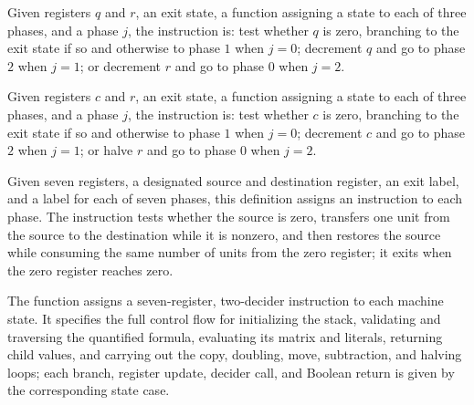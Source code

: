 \begin{definition}
\label{Complexity.LogProg.TQBFARM.sbI}
\leanok
{}
Given registers $q$ and $r$, an exit state, a function assigning a state to each of
three phases, and a phase $j$, the instruction is: test whether $q$ is zero, branching
to the exit state if so and otherwise to phase $1$ when $j=0$; decrement $q$ and go to
phase $2$ when $j=1$; or decrement $r$ and go to phase $0$ when $j=2$.
\end{definition}

\begin{definition}
\label{Complexity.LogProg.TQBFARM.hvI}
\leanok
{}
Given registers $c$ and $r$, an exit state, a function assigning a state to each of
three phases, and a phase $j$, the instruction is: test whether $c$ is zero, branching
to the exit state if so and otherwise to phase $1$ when $j=0$; decrement $c$ and go to
phase $2$ when $j=1$; or halve $r$ and go to phase $0$ when $j=2$.
\end{definition}

\begin{definition}
\label{Complexity.LogProg.TQBFARM.cpI}
\leanok
{}
Given seven registers, a designated source and destination register, an exit label, and
a label for each of seven phases, this definition assigns an instruction to each phase.
The instruction tests whether the source is zero, transfers one unit from the source to
the destination while it is nonzero, and then restores the source while consuming the
same number of units from the zero register; it exits when the zero register reaches
zero.
\end{definition}

\begin{definition}
\label{Complexity.LogProg.TQBFARM.A}
\leanok
{}
The function assigns a seven-register, two-decider instruction to each machine state. It
specifies the full control flow for initializing the stack, validating and traversing
the quantified formula, evaluating its matrix and literals, returning child values, and
carrying out the copy, doubling, move, subtraction, and halving loops; each branch,
register update, decider call, and Boolean return is given by the corresponding state
case.
\end{definition}

